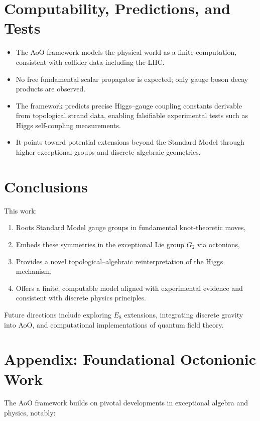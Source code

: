 \documentclass[12pt]{article}
\begin{document}
\section{Computability, Predictions, and Tests}

\begin{itemize}
    \item The AoO framework models the physical world as a finite computation, consistent with collider data including the LHC.
    \item No free fundamental scalar propagator is expected; only gauge boson decay products are observed.
    \item The framework predicts precise Higgs--gauge coupling constants derivable from topological strand data, enabling falsifiable experimental tests such as Higgs self-coupling measurements.
    \item It points toward potential extensions beyond the Standard Model through higher exceptional groups and discrete algebraic geometries.
\end{itemize}

\section{Conclusions}

This work:

\begin{enumerate}
    \item Roots Standard Model gauge groups in fundamental knot-theoretic moves,
    \item Embeds these symmetries in the exceptional Lie group $G_2$ via octonions,
    \item Provides a novel topological--algebraic reinterpretation of the Higgs mechanism,
    \item Offers a finite, computable model aligned with experimental evidence and consistent with discrete physics principles.
\end{enumerate}

Future directions include exploring $E_8$ extensions, integrating discrete gravity into AoO, and computational implementations of quantum field theory.

\appendix
\section*{Appendix: Foundational Octonionic Work}

The AoO framework builds on pivotal developments in exceptional algebra and physics, notably:
\end{document}
